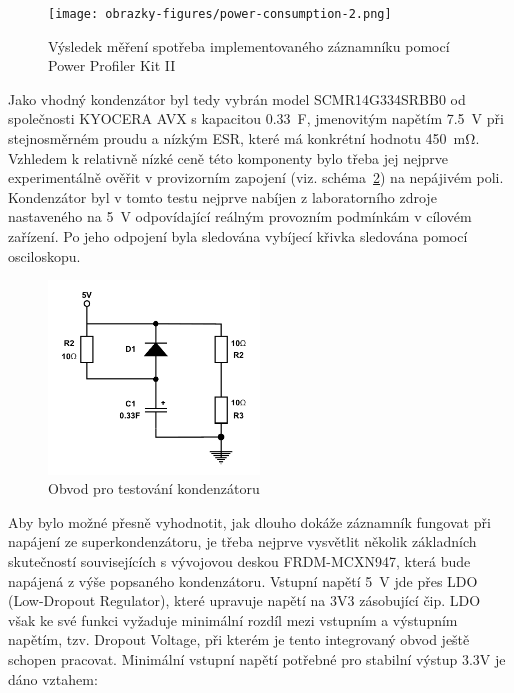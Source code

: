 \begin{figure}[h]
    \centering
    \texttt{[image: obrazky-figures/power-consumption-2.png]}
    
    \caption{Výsledek měření spotřeba implementovaného záznamníku pomocí Power Profiler Kit II 
    \cite{nordic_semi_ppk2}}
    \label{fig:power-consumption}
\end{figure}

\newpage

Jako vhodný kondenzátor byl tedy vybrán model SCMR14G334SRBB0 od společnosti KYOCERA AVX s kapacitou \SI{0.33}{\farad}, jmenovitým napětím \SI{7.5}{\volt} při stejnosměrném proudu a nízkým ESR, které má konkrétní hodnotu \SI{450}{\milli\ohm}. Vzhledem k relativně nízké ceně této komponenty bylo třeba jej nejprve experimentálně ověřit v provizorním zapojení (viz. schéma~\ref{fig:test-capacitors}) na nepájivém poli. Kondenzátor byl v tomto testu nejprve nabíjen z laboratorního zdroje nastaveného na \SI{5}{\volt} odpovídající reálným provozním podmínkám v cílovém zařízení. Po jeho odpojení byla sledována vybíjecí křivka sledována pomocí osciloskopu.

\begin{figure}[h]
    \centering
    \includegraphics[width=0.50\textwidth]{obrazky-figures/test_capacitors.pdf}
    
    \caption{Obvod pro testování kondenzátoru}
    \label{fig:test-capacitors}
\end{figure}

\newpage

Aby bylo možné přesně vyhodnotit, jak dlouho dokáže záznamník fungovat při napájení ze superkondenzátoru, je třeba nejprve vysvětlit několik základních skutečností souvisejících s vývojovou deskou FRDM-MCXN947, která bude napájená z výše popsaného kondenzátoru. Vstupní napětí \SI{5}{\volt} jde přes LDO (Low-Dropout Regulator), které upravuje napětí na 3V3 zásobující čip. LDO však ke své funkci vyžaduje minimální rozdíl mezi vstupním a výstupním napětím, tzv. Dropout Voltage, při kterém je tento integrovaný obvod ještě schopen pracovat. Minimální vstupní napětí potřebné pro stabilní výstup 3.3V je dáno vztahem:


